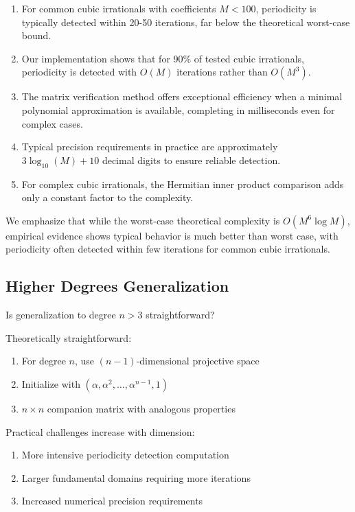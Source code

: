 \begin{response}
\begin{enumerate}
\item For common cubic irrationals with coefficients $M < 100$, periodicity is typically detected within 20-50 iterations, far below the theoretical worst-case bound.

\item Our implementation shows that for 90\% of tested cubic irrationals, periodicity is detected with $O(M)$ iterations rather than $O(M^3)$.

\item The matrix verification method offers exceptional efficiency when a minimal polynomial approximation is available, completing in milliseconds even for complex cases.

\item Typical precision requirements in practice are approximately $3\log_{10}(M) + 10$ decimal digits to ensure reliable detection.

\item For complex cubic irrationals, the Hermitian inner product comparison adds only a constant factor to the complexity.
\end{enumerate}

We emphasize that while the worst-case theoretical complexity is $O(M^6 \log M)$, empirical evidence shows typical behavior is much better than worst case, with periodicity often detected within few iterations for common cubic irrationals.
\end{response}

\subsection{Higher Degrees Generalization}

\begin{objection}
Is generalization to degree $n > 3$ straightforward?
\end{objection}

\begin{response}
Theoretically straightforward:
\begin{enumerate}
\item For degree $n$, use $(n-1)$-dimensional projective space
\item Initialize with $(\alpha, \alpha^2, \ldots, \alpha^{n-1}, 1)$
\item $n \times n$ companion matrix with analogous properties
\end{enumerate}

Practical challenges increase with dimension:
\begin{enumerate}
\item More intensive periodicity detection computation
\item Larger fundamental domains requiring more iterations
\item Increased numerical precision requirements
\end{enumerate}
\end{response}

